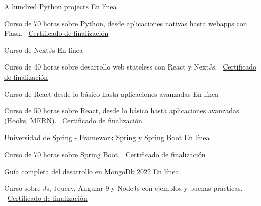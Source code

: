 \documentclass[]{awesome-cv}
\begin{document}
\begin{cventries}
    \cventry
    {}
    {A hundred Python projects}
    {En línea}
    {}
    {\begin{cvitems}
        \item {Curso de 70 horas sobre Python, desde aplicaciones nativas hasta webapps con Flask.
        \newline \faLink\ \href{https://www.udemy.com/certificate/UC-2d01021e-af92-434c-a4a3-7fc7b33976c9/}{Certificado de finalización}}
    \end{cvitems}}

    \cventry
    {}
    {Curso de NextJs}
    {En línea}
    {}
    {\begin{cvitems}
        \item {Curso de 40 horas sobre desarrollo web stateless con React y NextJs.
        \newline \faLink\ \href{https://www.udemy.com/certificate/UC-1ede8757-aa0d-406f-813a-8eaa400532c5/}{Certificado de finalización}}
    \end{cvitems}}

    \cventry
    {}
    {Curso de React desde lo básico hasta aplicaciones avanzadas}
    {En línea}
    {}
    {\begin{cvitems}
        \item {Curso de 50 horas sobre React, desde lo básico hasta aplicaciones avanzadas (Hooks, MERN).
        \newline \faLink\ \href{https://www.udemy.com/certificate/UC-fcb467ab-c089-419c-9b6a-afe97f894d14/}{Certificado de finalización}}
    \end{cvitems}}

    \cventry
    {}
    {Universidad de Spring - Framework Spring y Spring Boot}
    {En línea}
    {}
    {\begin{cvitems}
        \item {Curso de 70 horas sobre Spring Boot.
        \newline \faLink\ \href{https://www.udemy.com/certificate/UC-ee0ce349-6915-479b-b038-5253aba9d0d8/}{Certificado de finalización}}
    \end{cvitems}}

    \cventry
    {}
    {Guía completa del desarrollo en MongoDb 2022}
    {En línea}
    {}
    {\begin{cvitems}
        \item {Curso sobre Js, Jquery, Angular 9 y NodeJs con ejemplos y buenas prácticas.
        \newline \faLink\ \href{https://www.udemy.com/certificate/UC-b990e98a-9b76-44b1-8e3e-43b68213725c/}{Certificado de finalización}}
    \end{cvitems}}


\end{cventries}
\end{document}
